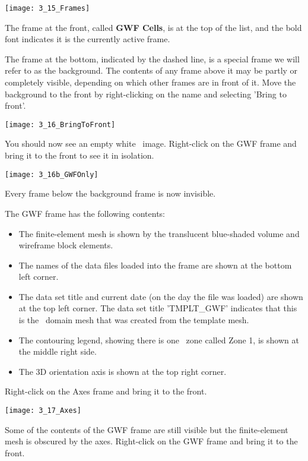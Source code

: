         \texttt{[image: 3\_15\_Frames]}

The frame at the front, called \textbf{GWF Cells}, is at the top of the list, and the bold font indicates it is the currently active frame.

The frame at the bottom, indicated by the dashed line, is a special frame we will refer to as the {\sf background}.  The contents of any frame above it may be partly or completely visible, depending on which other frames are in front of it.  Move the {\sf background} to the front by right-clicking on the name and selecting 'Bring to front'.

        \texttt{[image: 3\_16\_BringToFront]}

You should now see an empty white \tecplot\ image. Right-click on the {\sf GWF} frame and bring it to the front to see it in isolation.

        \texttt{[image: 3\_16b\_GWFOnly]}

Every frame below the {\sf background} frame is now invisible.

The {\sf GWF} frame has the following contents:
\begin{itemize}
  \item The finite-element mesh is shown by the translucent blue-shaded volume and wireframe block elements.
  \item The names of the data files loaded into the frame are shown at the bottom left corner.
  \item The data set title and current date (on the day the file was loaded) are shown at the top left corner.  The data set title 'TMPLT\_GWF' indicates that this is the \gwf\ domain mesh that was created from the template mesh.
  \item The contouring legend, showing there is one \gwf\ zone called {\sf Zone 1}, is shown at the middle right side.
  \item The 3D orientation axis is shown at the top right corner.
\end{itemize}

Right-click on the {\sf Axes} frame and bring it to the front.

        \texttt{[image: 3\_17\_Axes]}

Some of the contents of the {\sf GWF} frame are still visible but the finite-element mesh is obscured by the axes.  Right-click on the {\sf GWF} frame and bring it to the front.

